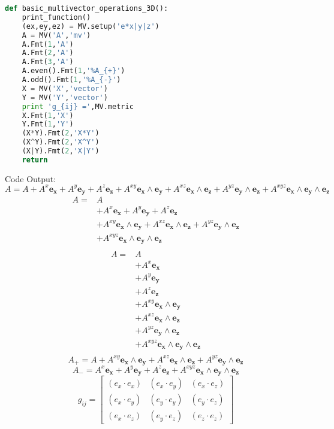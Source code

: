 \documentclass[10pt]{article}
\newcommand{\lp}{\left (}
\newcommand{\rp}{\right )}
\newcommand{\W}{\wedge}
\begin{document}
\begin{lstlisting}[language=Python,showspaces=false,showstringspaces=false,backgroundcolor=\color{gray},frame=single]
def basic_multivector_operations_3D():
    print_function()
    (ex,ey,ez) = MV.setup('e*x|y|z')
    A = MV('A','mv')
    A.Fmt(1,'A')
    A.Fmt(2,'A')
    A.Fmt(3,'A')
    A.even().Fmt(1,'%A_{+}')
    A.odd().Fmt(1,'%A_{-}')
    X = MV('X','vector')
    Y = MV('Y','vector')
    print 'g_{ij} =',MV.metric
    X.Fmt(1,'X')
    Y.Fmt(1,'Y')
    (X*Y).Fmt(2,'X*Y')
    (X^Y).Fmt(2,'X^Y')
    (X|Y).Fmt(2,'X|Y')
    return
\end{lstlisting}
Code Output:
\tiny
\begin{equation*} A = A+A^{x}\bm{e_{x}}+A^{y}\bm{e_{y}}+A^{z}\bm{e_{z}}+A^{xy}\bm{e_{x}\W e_{y}}+A^{xz}\bm{e_{x}\W e_{z}}+A^{yz}\bm{e_{y}\W e_{z}}+A^{xyz}\bm{e_{x}\W e_{y}\W e_{z}} \end{equation*}
 \begin{align*} A =  & A \\  & +A^{x}\bm{e_{x}}+A^{y}\bm{e_{y}}+A^{z}\bm{e_{z}} \\  & +A^{xy}\bm{e_{x}\W e_{y}}+A^{xz}\bm{e_{x}\W e_{z}}+A^{yz}\bm{e_{y}\W e_{z}} \\  & +A^{xyz}\bm{e_{x}\W e_{y}\W e_{z}} \\ \end{align*} 
 \begin{align*} A =  & A \\  & +A^{x}\bm{e_{x}} \\  & +A^{y}\bm{e_{y}} \\  & +A^{z}\bm{e_{z}} \\  & +A^{xy}\bm{e_{x}\W e_{y}} \\  & +A^{xz}\bm{e_{x}\W e_{z}} \\  & +A^{yz}\bm{e_{y}\W e_{z}} \\  & +A^{xyz}\bm{e_{x}\W e_{y}\W e_{z}} \\ \end{align*} 
\begin{equation*} A_{+} = A+A^{xy}\bm{e_{x}\W e_{y}}+A^{xz}\bm{e_{x}\W e_{z}}+A^{yz}\bm{e_{y}\W e_{z}} \end{equation*}
\begin{equation*} A_{-} = A^{x}\bm{e_{x}}+A^{y}\bm{e_{y}}+A^{z}\bm{e_{z}}+A^{xyz}\bm{e_{x}\W e_{y}\W e_{z}} \end{equation*}
\begin{equation*} g_{ij} = \left[\begin{smallmatrix}\lp e_{x}\cdot e_{x}\rp  & \lp e_{x}\cdot e_{y}\rp  & \lp e_{x}\cdot e_{z}\rp \\\lp e_{x}\cdot e_{y}\rp  & \lp e_{y}\cdot e_{y}\rp  & \lp e_{y}\cdot e_{z}\rp \\\lp e_{x}\cdot e_{z}\rp  & \lp e_{y}\cdot e_{z}\rp  & \lp e_{z}\cdot e_{z}\rp \end{smallmatrix}\right] \end{equation*}
\end{document}
